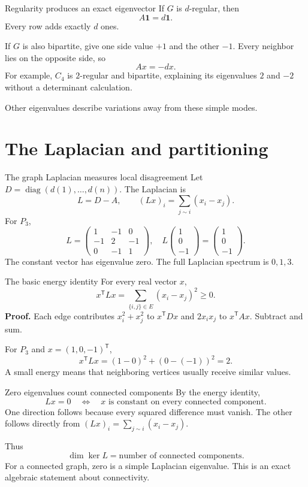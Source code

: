 \documentclass[aspectratio=169,11pt]{beamer}
\newcommand{\one}{\mathbf 1}
\begin{document}
\begin{frame}{Regularity produces an exact eigenvector}
If $G$ is $d$-regular, then
\[
 A\one=d\one.
\]
Every row adds exactly $d$ ones.

If $G$ is also bipartite, give one side value $+1$ and the other $-1$.
Every neighbor lies on the opposite side, so
\[
 Ax=-dx.
\]
For example, $C_4$ is $2$-regular and bipartite, explaining its eigenvalues
$2$ and $-2$ without a determinant calculation.

Other eigenvalues describe variations away from these simple modes.
\end{frame}


\section{The Laplacian and partitioning}


\begin{frame}{The graph Laplacian measures local disagreement}
Let $D=\operatorname{diag}(d(1),\ldots,d(n))$. The Laplacian is
\[
 L=D-A,\qquad (Lx)_i=\sum_{j\sim i}(x_i-x_j).
\]
For $P_3$,
\[
 L=\begin{pmatrix}1&-1&0\\-1&2&-1\\0&-1&1\end{pmatrix},\quad
 L\begin{pmatrix}1\\0\\-1\end{pmatrix}
 =\begin{pmatrix}1\\0\\-1\end{pmatrix}.
\]
The constant vector has eigenvalue zero. The full Laplacian spectrum is
$0,1,3$.
\end{frame}

\begin{frame}{The basic energy identity}
For every real vector $x$,
\[
 x^{\mathsf T}Lx=\sum_{\{i,j\}\in E}(x_i-x_j)^2\ge0.
\]
\textbf{Proof.} Each edge contributes $x_i^2+x_j^2$ to
$x^{\mathsf T}Dx$ and $2x_ix_j$ to $x^{\mathsf T}Ax$.
Subtract and sum.

For $P_3$ and $x=(1,0,-1)^{\mathsf T}$,
\[
 x^{\mathsf T}Lx=(1-0)^2+(0-(-1))^2=2.
\]
A small energy means that neighboring vertices usually receive similar
values.
\end{frame}

\begin{frame}{Zero eigenvalues count connected components}
By the energy identity,
\[
 Lx=0\quad\Longleftrightarrow\quad
 x\text{ is constant on every connected component}.
\]
One direction follows because every squared difference must vanish.
The other follows directly from $(Lx)_i=\sum_{j\sim i}(x_i-x_j)$.

Thus
\[
 \dim\ker L=\text{number of connected components}.
\]
For a connected graph, zero is a simple Laplacian eigenvalue.
This is an exact algebraic statement about connectivity.
\end{frame}
\end{document}
